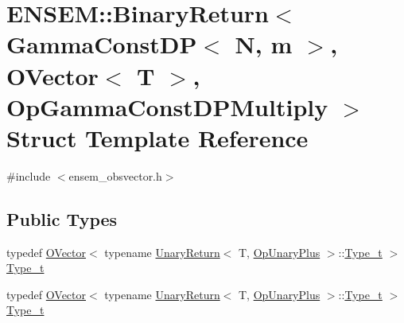 \hypertarget{structENSEM_1_1BinaryReturn_3_01GammaConstDP_3_01N_00_01m_01_4_00_01OVector_3_01T_01_4_00_01OpGammaConstDPMultiply_01_4}{}\section{E\+N\+S\+EM\+:\+:Binary\+Return$<$ Gamma\+Const\+DP$<$ N, m $>$, O\+Vector$<$ T $>$, Op\+Gamma\+Const\+D\+P\+Multiply $>$ Struct Template Reference}
\label{structENSEM_1_1BinaryReturn_3_01GammaConstDP_3_01N_00_01m_01_4_00_01OVector_3_01T_01_4_00_01OpGammaConstDPMultiply_01_4}


{\ttfamily \#include $<$ensem\+\_\+obsvector.\+h$>$}

\subsection*{Public Types}
\begin{DoxyCompactItemize}
\item 
typedef \mbox{\hyperlink{classENSEM_1_1OVector}{O\+Vector}}$<$ typename \mbox{\hyperlink{structENSEM_1_1UnaryReturn}{Unary\+Return}}$<$ T, \mbox{\hyperlink{structENSEM_1_1OpUnaryPlus}{Op\+Unary\+Plus}} $>$\+::\mbox{\hyperlink{structENSEM_1_1BinaryReturn_3_01GammaConstDP_3_01N_00_01m_01_4_00_01OVector_3_01T_01_4_00_01OpGammaConstDPMultiply_01_4_ad285fa26f308ce9f8939c009aab1bd0e}{Type\+\_\+t}} $>$ \mbox{\hyperlink{structENSEM_1_1BinaryReturn_3_01GammaConstDP_3_01N_00_01m_01_4_00_01OVector_3_01T_01_4_00_01OpGammaConstDPMultiply_01_4_ad285fa26f308ce9f8939c009aab1bd0e}{Type\+\_\+t}}
\item 
typedef \mbox{\hyperlink{classENSEM_1_1OVector}{O\+Vector}}$<$ typename \mbox{\hyperlink{structENSEM_1_1UnaryReturn}{Unary\+Return}}$<$ T, \mbox{\hyperlink{structENSEM_1_1OpUnaryPlus}{Op\+Unary\+Plus}} $>$\+::\mbox{\hyperlink{structENSEM_1_1BinaryReturn_3_01GammaConstDP_3_01N_00_01m_01_4_00_01OVector_3_01T_01_4_00_01OpGammaConstDPMultiply_01_4_ad285fa26f308ce9f8939c009aab1bd0e}{Type\+\_\+t}} $>$ \mbox{\hyperlink{structENSEM_1_1BinaryReturn_3_01GammaConstDP_3_01N_00_01m_01_4_00_01OVector_3_01T_01_4_00_01OpGammaConstDPMultiply_01_4_ad285fa26f308ce9f8939c009aab1bd0e}{Type\+\_\+t}}
\end{DoxyCompactItemize}


